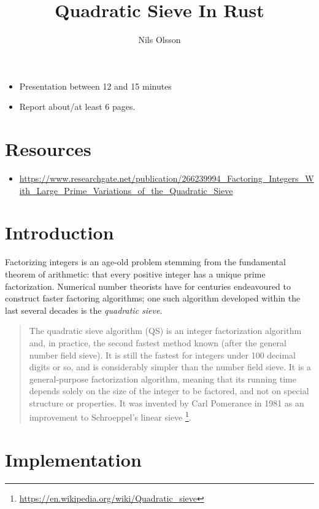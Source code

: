 \documentclass{article}
\begin{document}
\title{Quadratic Sieve In Rust}
\author{Nils Olsson}
\maketitle
\tableofcontents

\begin{itemize}
    \item Presentation between 12 and 15 minutes
    \item Report about/at least 6 pages.
\end{itemize}

\section*{Resources}
\begin{itemize}
    \item
        \url{https://www.researchgate.net/publication/266239994_Factoring_Integers_With_Large_Prime_Variations_of_the_Quadratic_Sieve}
\end{itemize}

\section{Introduction}

Factorizing integers is an age-old problem stemming from the fundamental theorem
of arithmetic: that every positive integer has a unique prime factorization.
Numerical number theorists have for centuries endeavoured to construct faster
factoring algorithms; one such algorithm developed within the last several
decades is the \emph{quadratic sieve}.
\begin{quote}
    The quadratic sieve algorithm (QS) is an integer factorization algorithm
    and, in practice, the second fastest method known (after the general number
    field sieve). It is still the fastest for integers under 100 decimal digits
    or so, and is considerably simpler than the number field sieve. It is a
    general-purpose factorization algorithm, meaning that its running time
    depends solely on the size of the integer to be factored, and not on special
    structure or properties. It was invented by Carl Pomerance in 1981 as an
    improvement to Schroeppel's linear sieve
    \footnote{\url{https://en.wikipedia.org/wiki/Quadratic\_sieve}}.
\end{quote}

\pagebreak
\section{Implementation}
\end{document}
